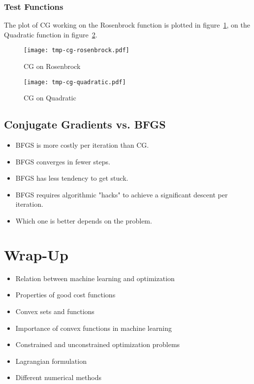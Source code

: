 \documentclass[a4paper, 11pt, accentcolor = tud3b]{tudreport}
\begin{document}
				\subsubsection{Test Functions}
					The plot of CG working on the Rosenbrock function is plotted in figure~\ref{fig:cgExampleRosenbrock}, on the Quadratic function in figure~\ref{fig:cgExampleQuadratic}.

					\begin{figure} 
						\centering
						\texttt{[image: tmp-cg-rosenbrock.pdf]}
						\caption{CG on Rosenbrock}
						\label{fig:cgExampleRosenbrock}
					\end{figure}
					\begin{figure}
						\centering
						\texttt{[image: tmp-cg-quadratic.pdf]}
						\caption{CG on Quadratic}
						\label{fig:cgExampleQuadratic}
					\end{figure}

			\subsection{Conjugate Gradients vs. BFGS}
				\begin{itemize}
					\item BFGS is more costly per iteration than CG.
					\item BFGS converges in fewer steps.
					\item BFGS has less tendency to get stuck.
					\item BFGS requires algorithmic "hacks" to achieve a significant descent per iteration.
					\item Which one is better depends on the problem.
				\end{itemize}
		
		\section{Wrap-Up}
			\begin{itemize}
				\item Relation between machine learning and optimization
				\item Properties of good cost functions
				\item Convex sets and functions
				\item Importance of convex functions in machine learning
				\item Constrained and unconstrained optimization problems
				\item Lagrangian formulation
				\item Different numerical methods
			\end{itemize}
\end{document}
